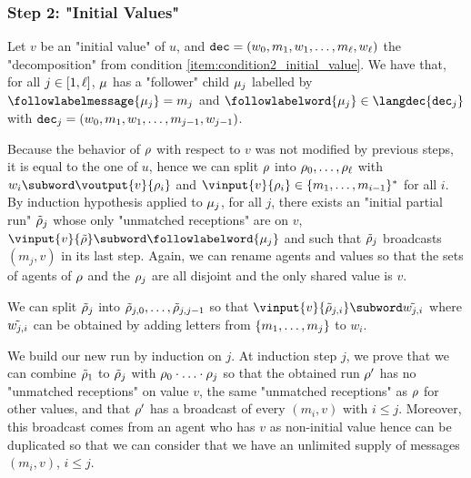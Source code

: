 \subsubsection{Step 2: "Initial Values"}
\label{sec:tree-to-run-step-two}


Let $v$ be an "initial value" of $u$, and $\mathtt{dec} = \\(w_0, m_1, w_1, \ldots, m_\ell, w_\ell)$ the "decomposition" from condition \ref{item:condition2_initial_value}. We have that, for all $j \in [1,\ell]$, $\mu$ has a "follower" child $\mu_j$ labelled by $\followlabelmessage{\node_j} = m_j$ and $\followlabelword{\node_j} \in \langdec{\decsymb_j}$ with $\mathtt{dec}_j = (w_0, m_1, w_1, \ldots, m_{j-1}, w_{j-1})$. 

Because the behavior of $\rho$ with respect to $v$ was not modified by previous steps, it is equal to the one of $u$, hence we can split $\rho$ into $\rho_0, \ldots, \rho_\ell$ with $w_i \subword \voutput{\aval}{\run_i}$ and $\vinput{\aval}{\run_i} \in \set{m_1, \dots, m_{i-1}}^*$ for all $i$. 
By induction hypothesis applied to $\mu_j$, for all $j$, there exists an "initial partial run" $\Tilde{\rho}_j$ whose only "unmatched receptions" are on $v$, $\vinput{v}{\Tilde{\run}} \subword \followlabelword{\node_{j}}$ and such that $\tilde{\rho}_j$ broadcasts $(m_j,v)$ in its last step. Again, we can rename agents and values so that the sets of agents of $\rho$ and the $\rho_j$ are all disjoint and the only shared value is $v$. 

We can split $\Tilde{\rho}_j$ into $\Tilde{\rho}_{j, 0}, \ldots, \Tilde{\rho}_{j,j-1}$ so that  $\vinput{v}{\Tilde{\run}_{j, i}} \subword \Tilde{w_{j,i}}$ where $\Tilde{w_{j,i}}$ can be obtained by adding letters from $\{m_1, \ldots, m_j\}$ to $w_i$.

We build our new run by induction on $j$. At induction step $j$, we prove that we can combine $\Tilde{\rho}_1$ to $\Tilde{\rho}_j$ with $\rho_0 \cdot \ldots \cdot \rho_j$ so that the obtained run $\rho'$ has no "unmatched receptions" on value $v$, the same "unmatched receptions" as $\rho$ for other values, and that $\rho'$ has a broadcast of every $(m_i,v)$ with $i \leq j$. Moreover, this broadcast comes from an agent who has $v$ as non-initial value hence can be duplicated so that we can consider that we have an unlimited supply of messages $(m_i,v)$, $i \leq j$. 

